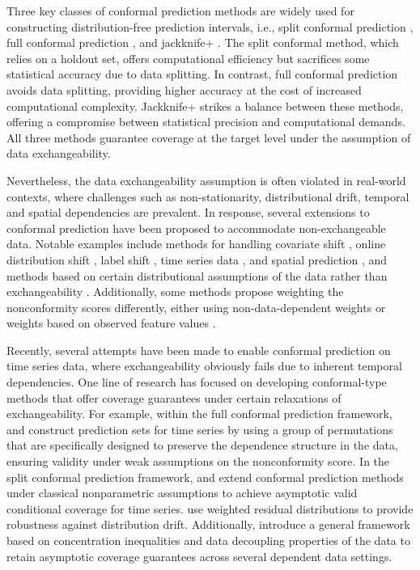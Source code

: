 \documentclass[
  11pt,
  a4paper,
]{article}
\theoremstyle{plain}
\theoremstyle{remark}
\begin{document}
Three key classes of conformal prediction methods are widely used for
constructing distribution-free prediction intervals, i.e., split
conformal prediction \autocite{vovk2005}, full conformal prediction
\autocite{vovk2005}, and jackknife+ \autocite{barber2021}. The split
conformal method, which relies on a holdout set, offers computational
efficiency but sacrifices some statistical accuracy due to data
splitting. In contrast, full conformal prediction avoids data splitting,
providing higher accuracy at the cost of increased computational
complexity. Jackknife+ strikes a balance between these methods, offering
a compromise between statistical precision and computational demands.
All three methods guarantee coverage at the target level under the
assumption of data exchangeability.

Nevertheless, the data exchangeability assumption is often violated in
real-world contexts, where challenges such as non-stationarity,
distributional drift, temporal and spatial dependencies are prevalent.
In response, several extensions to conformal prediction have been
proposed to accommodate non-exchangeable data. Notable examples include
methods for handling covariate shift
\autocite{tibshirani2019,lei2021,yang2024}, online distribution shift
\autocite{gibbs2021,zaffran2022,bastani2022}, label shift
\autocite{podkopaev2021}, time series data
\autocite{chernozhukov2018,gibbs2021,xu2021,xu2023,zaffran2022}, and
spatial prediction \autocite{mao2024}, and methods based on certain
distributional assumptions of the data rather than exchangeability
\autocite{oliveira2024,xu2021,xu2023}. Additionally, some methods
propose weighting the nonconformity scores differently, either using
non-data-dependent weights \autocite{barber2023} or weights based on
observed feature values \autocite{tibshirani2019,guan2023,hore2023}.

Recently, several attempts have been made to enable conformal prediction
on time series data, where exchangeability obviously fails due to
inherent temporal dependencies. One line of research has focused on
developing conformal-type methods that offer coverage guarantees under
certain relaxations of exchangeability. For example, within the full
conformal prediction framework, \textcite{chernozhukov2018} and
\textcite{yu2022} construct prediction sets for time series by using a
group of permutations that are specifically designed to preserve the
dependence structure in the data, ensuring validity under weak
assumptions on the nonconformity score. In the split conformal
prediction framework, \textcite{xu2021} and \textcite{xu2023} extend
conformal prediction methods under classical nonparametric assumptions
to achieve asymptotic valid conditional coverage for time series.
\textcite{barber2023} use weighted residual distributions to provide
robustness against distribution drift. Additionally,
\textcite{oliveira2024} introduce a general framework based on
concentration inequalities and data decoupling properties of the data to
retain asymptotic coverage guarantees across several dependent data
settings.
\end{document}
